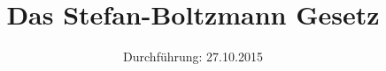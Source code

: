 

\subject{Versuchsprotokoll zum Versuch Nr. 207}
\title{ Das Stefan-Boltzmann Gesetz}
\date{
  Durchführung: 27.10.2015
}


\maketitle
\thispagestyle{empty}
\newpage






\printbibliography


